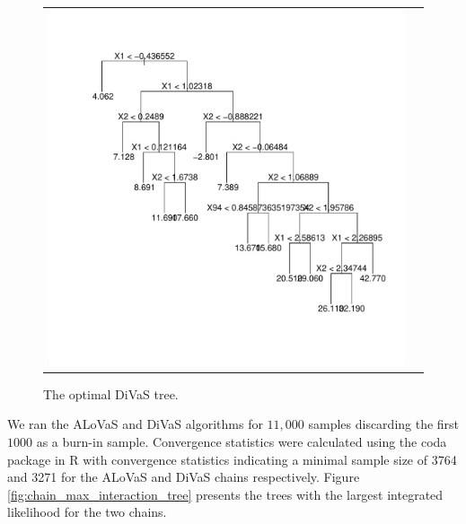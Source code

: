 \begin{figure}
\begin{center} 
\begin{tabular}{cc}
\includegraphics[scale=0.25]{figures/divas_tree_alovas_divas_compare.pdf}
\end{tabular}
\caption{The optimal DiVaS tree.}
\label{fig:interaction_trees}
\end{center}
\end{figure} 

We ran the ALoVaS and DiVaS algorithms for $11,000$ samples discarding the first $1000$ as a burn-in sample. Convergence statistics were calculated using the coda package in R with convergence statistics indicating a minimal sample size of 3764 and 3271 for the ALoVaS and DiVaS chains respectively. Figure \ref{fig:chain_max_interaction_tree} presents the trees with the largest integrated likelihood for the two chains.  

